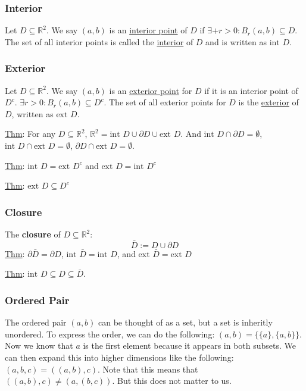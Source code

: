 \documentclass[11 pt, twoside]{article}
\begin{document}
\subsubsection{Interior}
Let $D \subseteq \mathbb{R}^2$. We say $(a, b)$ is an
\underline{interior point} of $D$ if $\exists+ r > 0:B_r(a, b)\subseteq D$.
The set of all interior points is called the \underline{interior} of $D$ and is
written as $\text{int } D$.

\subsubsection{Exterior}
Let $D \subseteq \mathbb{R}^2$. We say $(a, b)$ is an
\underline{exterior point} for $D$ if it is an interior point of $D^c$.
$\exists r > 0: B_r(a, b) \subseteq D^c$.
The set of all exterior points for $D$ is the \underline{exterior} of $D$,
written as $\text{ext } D$.
\par \underline{Thm}: For any $D \subseteq \mathbb{R}^2$, $\mathbb{R}^2 =
\text{int } D \cup \partial D \cup \text{ext } D$. And $\text{int } D \cap
\partial D = \emptyset$, $\text{int } D \cap \text{ext } D = \emptyset$,
$\partial D \cap \text{ext } D = \emptyset$.
\par \underline{Thm}: $\text{int } D = \text{ext } D^c$ and $\text{ext } D =
\text{int } D^c$
\par \underline{Thm}: $\text{ext } D \subseteq D^c$

\subsubsection{Closure}
The \textbf{closure} of $D \subseteq \mathbb{R}^2$:
$$\bar{D} := D \cup \partial D$$
\underline{Thm}: $\partial \bar{D} = \partial D$, $\text{int } \bar{D} =
\text{int } D$, and $\text{ext } \bar{D} = \text{ext } D$
\par \underline{Thm}: $\text{int } D \subseteq D \subseteq \bar{D}$.

\subsubsection{Ordered Pair}
The ordered pair $(a, b)$ can be thought of as a set, but a set is inheritly
unordered. To express the order, we can do the following: $(a, b) = \{\{a\},
\{a, b\}\}$. Now we know that $a$ is the first element because it appears in
both subsets.
We can then expand this into higher dimensions like the following:
$(a, b, c) = ((a, b), c)$. Note that this means that $((a, b), c) \neq (a, (b,
c))$. But this does not matter to us.
\end{document}
